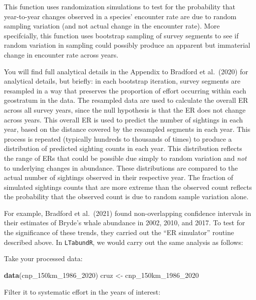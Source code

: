 \documentclass[
]{book}
\newenvironment{Shaded}{\begin{snugshade}}{\end{snugshade}}
\newcommand{\DecValTok}[1]{\textcolor[rgb]{0.00,0.00,0.81}{#1}}
\newcommand{\KeywordTok}[1]{\textcolor[rgb]{0.13,0.29,0.53}{\textbf{#1}}}
\newcommand{\NormalTok}[1]{#1}
\newcommand{\StringTok}[1]{\textcolor[rgb]{0.31,0.60,0.02}{#1}}
\begin{document}
This function uses randomization simulations to test for the probability that year-to-year changes observed in a species' encounter rate are due to random sampling variation (and not actual change in the encounter rate). More specifcially, this function uses bootstrap sampling of survey segments to see if random variation in sampling could possibly produce an apparent but immaterial change in encounter rate across years.

You will find full analytical details in the Appendix to Bradford et al.~(2020) for analytical details, but briefly: in each bootstrap iteration, survey segments are resampled in a way that preserves the proportion of effort occurring within each geostratum in the data. The resampled data are used to calculate the overall ER across all survey years, since the null hypothesis is that the ER does not change across years. This overall ER is used to predict the number of sightings in each year, based on the distance covered by the resampled segments in each year. This process is repeated (typically hundreds to thousands of times) to produce a distribution of predicted sighting counts in each year. This distribution reflects the range of ERs that could be possible due simply to random variation and \emph{not} to underlying changes in abundance. These distributions are compared to the actual number of sightings observed in their respective year. The fraction of simulated sightings counts that are more extreme than the observed count reflects the probability that the observed count is due to random sample variation alone.

For example, Bradford et al.~(2021) found non-overlapping confidence intervals in their estimates of Bryde's whale abundance in 2002, 2010, and 2017. To test for the significance of these trends, they carried out the ``ER simulator'' routine described above. In \texttt{LTabundR}, we would carry out the same analysis as follows:

Take your processed data:

\begin{Shaded}
\begin{Highlighting}[]
\KeywordTok{data}\NormalTok{(cnp_150km_}\DecValTok{1986}\NormalTok{_}\DecValTok{2020}\NormalTok{)}
\NormalTok{cruz <-}\StringTok{ }\NormalTok{cnp_150km_}\DecValTok{1986}\NormalTok{_}\DecValTok{2020}
\end{Highlighting}
\end{Shaded}

Filter it to systematic effort in the years of interest:
\end{document}
